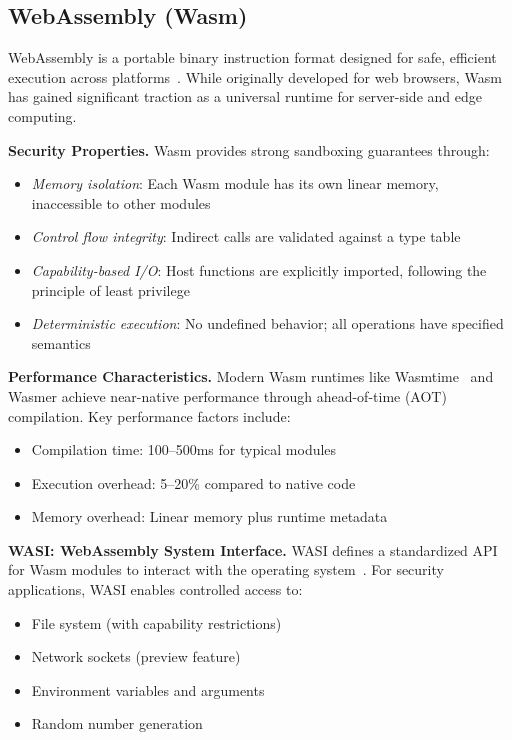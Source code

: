 \subsection{WebAssembly (Wasm)}
\label{sec:bg-wasm}

WebAssembly is a portable binary instruction format designed for safe, efficient execution across platforms~\cite{wasm-spec}.
While originally developed for web browsers, Wasm has gained significant traction as a universal runtime for server-side and edge computing.

\textbf{Security Properties.}
Wasm provides strong sandboxing guarantees through:
\begin{itemize}
    \item \textit{Memory isolation}: Each Wasm module has its own linear memory, inaccessible to other modules
    \item \textit{Control flow integrity}: Indirect calls are validated against a type table
    \item \textit{Capability-based I/O}: Host functions are explicitly imported, following the principle of least privilege
    \item \textit{Deterministic execution}: No undefined behavior; all operations have specified semantics
\end{itemize}

\textbf{Performance Characteristics.}
Modern Wasm runtimes like Wasmtime~\cite{wasmtime} and Wasmer achieve near-native performance through ahead-of-time (AOT) compilation.
Key performance factors include:
\begin{itemize}
    \item Compilation time: 100--500ms for typical modules
    \item Execution overhead: 5--20\% compared to native code
    \item Memory overhead: Linear memory plus runtime metadata
\end{itemize}

\textbf{WASI: WebAssembly System Interface.}
WASI defines a standardized API for Wasm modules to interact with the operating system~\cite{wasi}.
For security applications, WASI enables controlled access to:
\begin{itemize}
    \item File system (with capability restrictions)
    \item Network sockets (preview feature)
    \item Environment variables and arguments
    \item Random number generation
\end{itemize}

